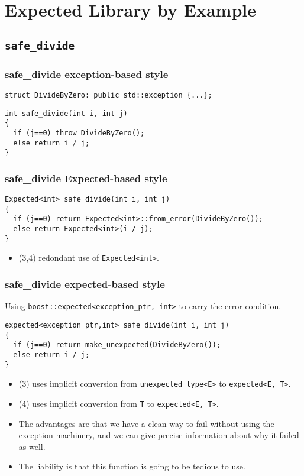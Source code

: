 \documentclass[xcolor=dvipsnames]{beamer}
\newcommand{\cpp}[1]{\lstinline{#1}}
\begin{document}
\section{Expected Library by Example}
\subsection{\cpp{safe_divide}}
\begin{frame}[fragile]
\frametitle{safe\_divide exception-based style}

\begin{lstlisting}
struct DivideByZero: public std::exception {...};
\end{lstlisting}

\begin{lstlisting}
int safe_divide(int i, int j)
{
  if (j==0) throw DivideByZero();
  else return i / j;
}
\end{lstlisting}
\end{frame}
\begin{frame}[fragile]
\frametitle{safe\_divide Expected-based style}

\begin{lstlisting}
Expected<int> safe_divide(int i, int j)
{
  if (j==0) return Expected<int>::from_error(DivideByZero());
  else return Expected<int>(i / j);
}
\end{lstlisting}
\begin{itemize}
  \item (3,4) redondant use of  \cpp{Expected<int>}. 
\end{itemize}

\end{frame}
\begin{frame}[fragile]
\frametitle{safe\_divide expected-based style}

Using \cpp{boost::expected<exception_ptr, int>} to carry the error condition.

\begin{lstlisting}
expected<exception_ptr,int> safe_divide(int i, int j)
{
  if (j==0) return make_unexpected(DivideByZero());
  else return i / j;
}
\end{lstlisting}

\begin{itemize}
  \item (3) uses implicit conversion from \cpp{unexpected_type<E>} to \cpp{expected<E, T>}. 
  \item (4) uses implicit conversion from \cpp{T} to \cpp{expected<E, T>}.
\end{itemize}

\begin{itemize}
\item The advantages are that we have a clean way to fail without using the exception machinery, and we can give precise information about why it failed as well. 
\item The liability is that this function is going to be tedious to use.
\end{itemize}

\end{frame}
\end{document}
